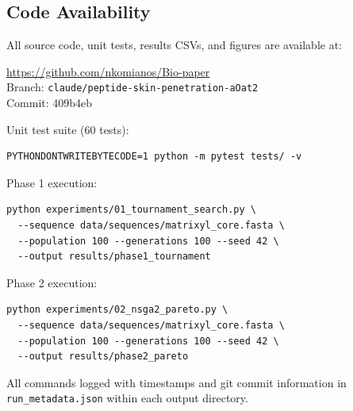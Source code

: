 \documentclass[11pt,a4paper]{article}
\begin{document}
\subsection{Code Availability}

All source code, unit tests, results CSVs, and figures are available at:
\begin{center}
\url{https://github.com/nkomianos/Bio-paper}\\
Branch: \texttt{claude/peptide-skin-penetration-aOat2}\\
Commit: 409b4eb
\end{center}

Unit test suite (60 tests):
\begin{verbatim}
PYTHONDONTWRITEBYTECODE=1 python -m pytest tests/ -v
\end{verbatim}

Phase 1 execution:
\begin{verbatim}
python experiments/01_tournament_search.py \
  --sequence data/sequences/matrixyl_core.fasta \
  --population 100 --generations 100 --seed 42 \
  --output results/phase1_tournament
\end{verbatim}

Phase 2 execution:
\begin{verbatim}
python experiments/02_nsga2_pareto.py \
  --sequence data/sequences/matrixyl_core.fasta \
  --population 100 --generations 100 --seed 42 \
  --output results/phase2_pareto
\end{verbatim}

All commands logged with timestamps and git commit information in \texttt{run\_metadata.json} within each output directory.
\end{document}
